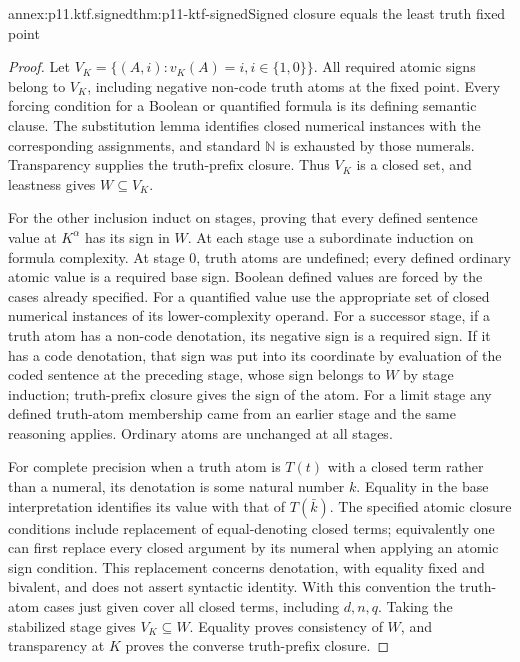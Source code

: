 \begin{annexitem}{annex:p11.ktf.signed}{thm:p11-ktf-signed}{Signed closure equals the least truth fixed point}
\begin{proof}
Let \(V_K=\{(A,i):v_K(A)=i, i\in\{1,0\}\}\).
All required atomic signs belong to \(V_K\), including negative
non-code truth atoms at the fixed point. Every forcing condition for a
Boolean or quantified formula is its defining semantic clause. The
substitution lemma identifies closed numerical instances with the
corresponding assignments, and standard \(\mathbb N\) is exhausted
by those numerals. Transparency supplies the truth-prefix closure.
Thus \(V_K\) is a closed set, and leastness gives \(W\subseteq V_K\).

For the other inclusion induct on stages, proving that every defined
sentence value at \(K^\alpha\) has its sign in \(W\). At each
stage use a subordinate induction on formula complexity. At stage \(0\),
truth atoms are undefined; every defined ordinary atomic value is a
required base sign. Boolean defined values are forced by the cases
already specified. For a quantified value use the appropriate set of
closed numerical instances of its lower-complexity operand. For a
successor stage, if a truth atom has a non-code denotation, its negative
sign is a required sign. If it has a code denotation, that sign was
put into its coordinate by evaluation of the coded sentence at the
preceding stage, whose sign belongs to \(W\) by stage induction;
truth-prefix closure gives the sign of the atom. For a limit stage any
defined truth-atom membership came from an earlier stage and the same
reasoning applies. Ordinary atoms are unchanged at all stages.

For complete precision when a truth atom is \(T(t)\) with a closed
term rather than a numeral, its denotation is some natural number \(k\).
Equality in the base interpretation identifies its value with that of
\(T(\bar k)\). The specified atomic closure conditions include
replacement of equal-denoting closed terms; equivalently
one can first replace every closed argument by its numeral when applying
an atomic sign condition. This replacement concerns denotation, with
equality fixed and bivalent, and does not assert syntactic identity.
With this convention the truth-atom cases just given cover all closed
terms, including \(d,n,q\). Taking the stabilized stage gives
\(V_K\subseteq W\). Equality proves consistency of \(W\),
and transparency at \(K\) proves the converse truth-prefix closure.
\end{proof}
\end{annexitem}

